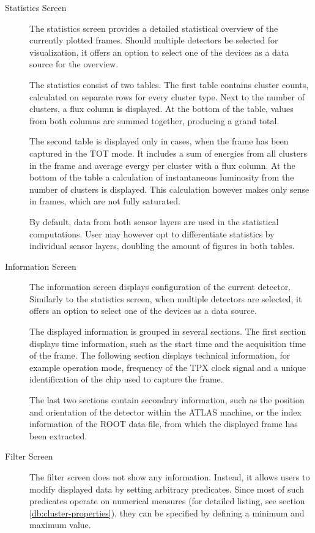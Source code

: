 \begin{description}
	\item[Statistics Screen]
	The statistics screen provides a detailed statistical overview of the currently plotted frames. Should multiple detectors be selected for visualization, it offers an option to select one of the devices as a data source for the overview.

	The statistics consist of two tables. The first table contains cluster counts, calculated on separate rows for every cluster type. Next to the number of clusters, a flux column is displayed. At the bottom of the table, values from both columns are summed together, producing a grand total.

	The second table is displayed only in cases, when the frame has been captured in the TOT mode. It includes a sum of energies from all clusters in the frame and average evergy per cluster with a flux column. At the bottom of the table a calculation of instantaneous luminosity from the number of clusters is displayed. This calculation however makes only sense in frames, which are not fully saturated.

	By default, data from both sensor layers are used in the statistical computations. User may however opt to differentiate statistics by individual sensor layers, doubling the amount of figures in both tables.

	\item[Information Screen]
	The information screen displays configuration of the current detector. Similarly to the statistics screen, when multiple detectors are selected, it offers an option to select one of the devices as a data source.

	The displayed information is grouped in several sections. The first section displays time information, such as the start time and the acquisition time of the frame. The following section displays technical information, for example operation mode, frequency of the TPX clock signal and a unique identification of the chip used to capture the frame.

	The last two sections contain secondary information, such as the position and orientation of the detector within the ATLAS machine, or the index information of the ROOT data file, from which the displayed frame has been extracted.

	\item[Filter Screen]
	The filter screen does not show any information. Instead, it allows users to modify displayed data by setting arbitrary predicates. Since most of such predicates operate on numerical measures (for detailed listing, see section \ref{db:cluster-properties}), they can be specified by defining a minimum and maximum value.


\end{description}
